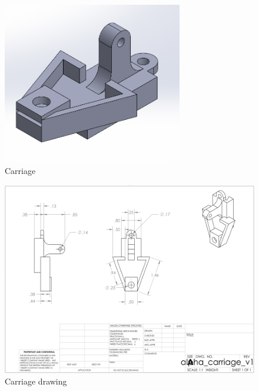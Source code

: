 \begin{figure}[H]
    \centering
    \includegraphics[width=0.7\textwidth]{src/figs/cad-and-dwgs/carriage-cad.png}
    \caption{Carriage}
    \label{cad:carriage}
\end{figure}

\begin{figure}[H]
    \centering
    \includegraphics[width=\textwidth]{src/figs/cad-and-dwgs/carriage_dwg.png}
    \caption{Carriage drawing}
    \label{cad:carriage:dwg}
\end{figure}

